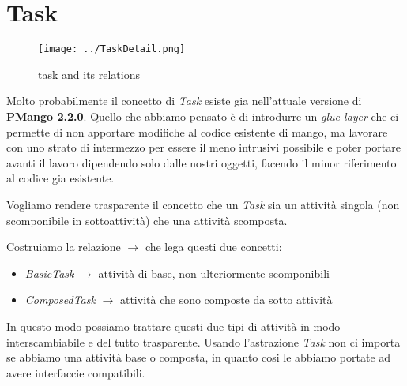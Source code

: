 \section{Task}
\label{sec:task}

\begin{figure}[h!] 
	\centering
	\texttt{[image: ../TaskDetail.png]}
	\caption{task and its relations}
	\label{fig:task} 
\end{figure}

Molto probabilmente il concetto di \emph{Task} esiste gia nell'attuale
versione di \textbf{PMango 2.2.0}. Quello che abbiamo pensato \`e di introdurre
un \emph{glue layer} che ci permette di non apportare modifiche al codice
esistente di mango, ma lavorare con uno strato di intermezzo per essere il meno
intrusivi possibile e poter portare avanti il lavoro dipendendo solo dalle
nostri oggetti, facendo il minor riferimento al codice gia esistente.

Vogliamo rendere trasparente il concetto che un \emph{Task} sia un attivit\`a
singola (non scomponibile in sottoattivit\`a) che una attivit\`a scomposta. 

Costruiamo la relazione $\rightarrow$ che lega questi due concetti:
\begin{itemize}
  \item \emph{BasicTask} $\rightarrow$ attivit\`a di base, non ulteriormente
  scomponibili
  \item \emph{ComposedTask} $\rightarrow$ attivit\`a che sono composte da sotto
  attivit\`a
\end{itemize}
In questo modo possiamo trattare questi due tipi di attivit\`a in modo
interscambiabile e del tutto trasparente. Usando l'astrazione \emph{Task} non
ci importa se abbiamo una attivit\`a base o composta, in quanto cosi le abbiamo
portate ad avere interfaccie compatibili.
